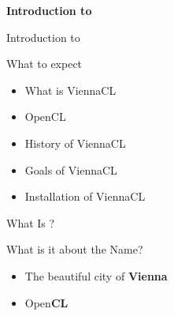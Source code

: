 



\begin{frame}{ }
 \begin{center}
  \Large \textbf{Introduction to \ViennaCL}
 \end{center}
\end{frame}


\begin{frame}{Introduction to \ViennaCL}

\begin{block}{What to expect}
  \begin{itemize}
   \item What is ViennaCL
   \item OpenCL
   \item History of ViennaCL
   \item Goals of ViennaCL
   \item Installation of ViennaCL
  \end{itemize}
\end{block}

\end{frame}




\begin{frame}{What Is \ViennaCL?}

\begin{block}{What is it about the Name?}
\begin{itemize}
  \item The beautiful city of \textbf{Vienna}
  \item Open\textbf{CL}
\end{itemize}
\end{block}

\vspace{3.4cm}

\end{frame}


% 
% 
% 


